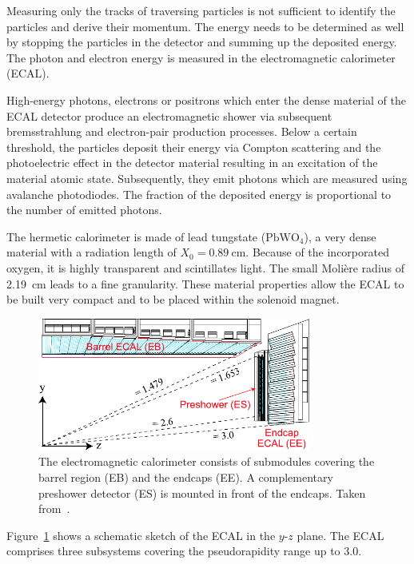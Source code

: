 Measuring only the tracks of traversing particles is not sufficient to identify
the particles and derive their momentum. The energy needs to be determined as well
by stopping the particles in the detector and summing up the
deposited energy. The photon and electron energy is measured in the
electromagnetic calorimeter (ECAL). 

High-energy photons, electrons or positrons which enter the dense material of
the ECAL detector produce an electromagnetic shower via subsequent
bremsstrahlung and electron-pair production processes. Below a certain
threshold, the particles deposit their energy via Compton scattering and the
photoelectric effect in the detector material resulting in an excitation of the
material atomic state. Subsequently, they emit photons which are measured using
avalanche photodiodes. The fraction of the deposited energy is proportional to
the number of emitted photons.

The hermetic calorimeter is made of lead tungstate ($\mathrm{PbWO}_4$), a very
dense material with a radiation length of $X_0 = \SI{0.89}{\centi\meter}$.
Because of the incorporated oxygen, it is highly transparent and scintillates
light. The small Moli\`ere  radius of \SI{2.19}{\centi\meter} leads to a fine
granularity.  These material properties allow the ECAL to be built very compact
and to be placed within the solenoid magnet. 

\begin{figure}[tbp]
    \centering
    \includegraphics[width=0.8\textwidth]{figures/experimental_setup/cms_ecal.pdf}\hfill
    \caption[Electromagnetic calorimeter]{The electromagnetic calorimeter
    consists of submodules covering the barrel region (EB) and the endcaps (EE).
    A complementary preshower detector (ES) is mounted in front of the
    endcaps. Taken from~\cite{Bayatian:922757}.}
    \label{fig:cms:ecal}
\end{figure}

Figure~\ref{fig:cms:ecal} shows a schematic sketch of the ECAL in the $y$-$z$
plane. The ECAL comprises three subsystems covering the pseudorapidity
range up to 3.0. 

